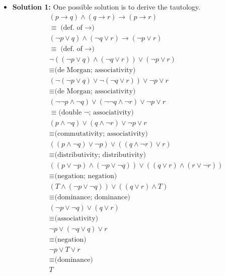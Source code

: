 \begin{enumerate}
{\begin{itemize}
\item \textbf{Solution 1:} One possible solution is to derive the tautology.
\allowdisplaybreaks
\begin{align*}
& (p \rightarrow q) \wedge (q \rightarrow r) \rightarrow (p \rightarrow r) \\ & \equiv \text{(def. of $\rightarrow$)} \\
& (\neg{p} \vee q) \wedge (\neg{q} \vee r) \rightarrow (\neg{p} \vee r) \\ & \equiv \text{(def. of $\rightarrow$)} \\
& \neg{((\neg{p} \vee q) \wedge (\neg{q} \vee r))} \vee (\neg{p} \vee r) \\ & \equiv \text{(de Morgan; associativity)} \\
& (\neg{(\neg{p} \vee q)} \vee \neg{(\neg{q} \vee r)}) \vee \neg{p} \vee r  \\ & \equiv \text{(de Morgan; associativity)} \\
& (\neg{\neg{p}} \wedge \neg{q}) \vee (\neg{\neg{q}} \wedge \neg{r}) \vee \neg{p} \vee r  \\ & \equiv \text{(double $\neg$; associativity)} \\
& (p \wedge \neg{q}) \vee (q \wedge \neg{r}) \vee \neg{p} \vee r  \\ & \equiv \text{(commutativity; associativity)} \\
& ((p \wedge \neg{q}) \vee \neg{p}) \vee ((q \wedge \neg{r})  \vee r)  \\ & \equiv \text{(distributivity; distributivity)} \\
& ((p \vee \neg{p}) \wedge (\neg{p} \vee \neg{q})) \vee ((q \vee r) \wedge (r \vee \neg{r})) \\ & \equiv \text{(negation; negation)} \\
& (T \wedge (\neg{p} \vee \neg{q})) \vee ((q \vee r) \wedge T) \\ & \equiv \text{(dominance; dominance)} \\
& (\neg{p} \vee \neg{q}) \vee (q \vee r) \\ & \equiv \text{(associativity)} \\
& \neg{p} \vee (\neg{q} \vee q) \vee r \\ & \equiv \text{(negation)} \\
& \neg{p} \vee T \vee r \\ & \equiv \text{(dominance)} \\
& T 
\end{align*}


\end{itemize}}
\end{enumerate}
